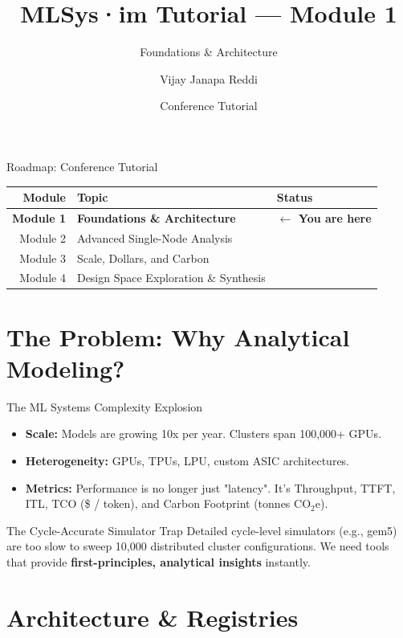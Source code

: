 \documentclass[aspectratio=169, 12pt]{beamer}
\title{MLSys·im Tutorial --- Module 1}
\subtitle{Foundations \& Architecture}
\author{Vijay Janapa Reddi}
\institute{Harvard University}
\date{Conference Tutorial}
\begin{document}
\begin{frame}[plain,shrink=10]
  \titlepage
\end{frame}

\begin{frame}{Roadmap: Conference Tutorial}
\centering\small
\begin{tabular}{rll}
\toprule
\textbf{Module} & \textbf{Topic} & \textbf{Status} \\
\midrule
\rowcolor{crimson!12}
\textbf{Module 1} & \textbf{Foundations \& Architecture} & \textbf{$\leftarrow$ You are here} \\
Module 2 & Advanced Single-Node Analysis & \\
Module 3 & Scale, Dollars, and Carbon & \\
Module 4 & Design Space Exploration \& Synthesis & \\
\bottomrule
\end{tabular}
\end{frame}

\section{The Problem: Why Analytical Modeling?}

\begin{frame}{The ML Systems Complexity Explosion}
\begin{itemize}
  \item \textbf{Scale:} Models are growing 10x per year. Clusters span 100,000+ GPUs.
  \item \textbf{Heterogeneity:} GPUs, TPUs, LPU, custom ASIC architectures.
  \item \textbf{Metrics:} Performance is no longer just "latency". It's Throughput, TTFT, ITL, TCO (\$ / token), and Carbon Footprint (tonnes CO$_2$e).
\end{itemize}
\vfill
\begin{alertblock}{The Cycle-Accurate Simulator Trap}
Detailed cycle-level simulators (e.g., gem5) are too slow to sweep 10,000 distributed cluster configurations. We need tools that provide \textbf{first-principles, analytical insights} instantly.
\end{alertblock}
\end{frame}

\section{Architecture \& Registries}
\end{document}
